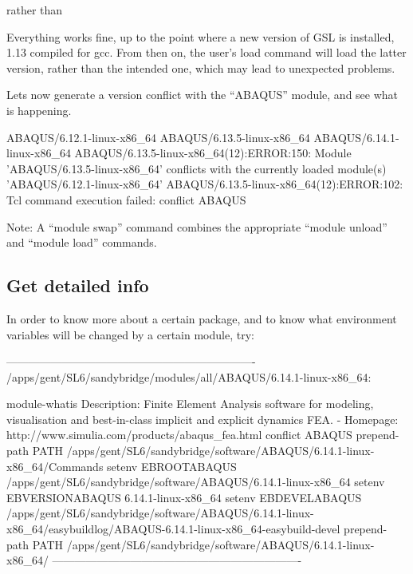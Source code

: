 rather than

\begin{prompt}
\end{prompt}

Everything works fine, up to the point where a new version of GSL is installed,
1.13 compiled for gcc. From then on, the user's load command will load the
latter version, rather than the intended one, which may lead to unexpected
problems.

Lets now generate a version conflict with the ``ABAQUS'' module, and see what
is happening.

\begin{prompt}
ABAQUS/6.12.1-linux-x86_64
ABAQUS/6.13.5-linux-x86_64
ABAQUS/6.14.1-linux-x86_64
ABAQUS/6.13.5-linux-x86_64(12):ERROR:150: Module 'ABAQUS/6.13.5-linux-x86_64' conflicts with the currently loaded module(s) 'ABAQUS/6.12.1-linux-x86_64'
ABAQUS/6.13.5-linux-x86_64(12):ERROR:102: Tcl command execution failed: conflict ABAQUS
\end{prompt}

Note: A ``module swap'' command combines the appropriate ``module unload''
and ``module load'' commands.

\subsection{Get detailed info}

In order to know more about a certain package, and to know what environment
variables will be changed by a certain module, try:

\begin{prompt}
-------------------------------------------------------------------
/apps/gent/SL6/sandybridge/modules/all/ABAQUS/6.14.1-linux-x86_64:

module-whatis    Description: Finite Element Analysis software for modeling, visualisation and best-in-class implicit and explicit dynamics FEA. - Homepage: http://www.simulia.com/products/abaqus_fea.html
conflict     ABAQUS
prepend-path PATH /apps/gent/SL6/sandybridge/software/ABAQUS/6.14.1-linux-x86_64/Commands
setenv       EBROOTABAQUS /apps/gent/SL6/sandybridge/software/ABAQUS/6.14.1-linux-x86_64
setenv       EBVERSIONABAQUS 6.14.1-linux-x86_64
setenv       EBDEVELABAQUS /apps/gent/SL6/sandybridge/software/ABAQUS/6.14.1-linux-x86_64/easybuildlog/ABAQUS-6.14.1-linux-x86_64-easybuild-devel
prepend-path PATH /apps/gent/SL6/sandybridge/software/ABAQUS/6.14.1-linux-x86_64/
-------------------------------------------------------------------
\end{prompt}

